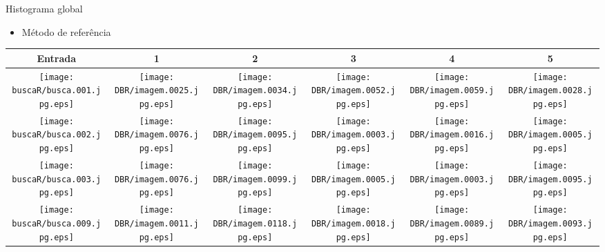 \documentclass[
    style=paintings,
    paper=screen,
    blackslide,
    nopagebreaks,
    fleqn
]{powerdot}
\begin{document}
\begin{slide}{Histograma global}
\begin{itemize}[type=1]
\item <1-> Método de referência
\end{itemize}
\vspace{-0.8cm}
\begin{table}[H]
\begin{center}
\begin{tabular}{c|ccccc}
\hline 
Entrada & 1 & 2 & 3 & 4 & 5\tabularnewline
\hline
\texttt{[image: buscaR/busca.001.jpg.eps]} & 
\texttt{[image: DBR/imagem.0025.jpg.eps]} & 
\texttt{[image: DBR/imagem.0034.jpg.eps]} & 
\texttt{[image: DBR/imagem.0052.jpg.eps]} & 
\texttt{[image: DBR/imagem.0059.jpg.eps]} &
\texttt{[image: DBR/imagem.0028.jpg.eps]} 
\tabularnewline
\hline 
\texttt{[image: buscaR/busca.002.jpg.eps]} & 
\texttt{[image: DBR/imagem.0076.jpg.eps]} & 
\texttt{[image: DBR/imagem.0095.jpg.eps]} & 
\texttt{[image: DBR/imagem.0003.jpg.eps]} & 
\texttt{[image: DBR/imagem.0016.jpg.eps]} &
\texttt{[image: DBR/imagem.0005.jpg.eps]} 
\tabularnewline
\hline 
\texttt{[image: buscaR/busca.003.jpg.eps]} & 
\texttt{[image: DBR/imagem.0076.jpg.eps]} & 
\texttt{[image: DBR/imagem.0099.jpg.eps]} & 
\texttt{[image: DBR/imagem.0005.jpg.eps]} & 
\texttt{[image: DBR/imagem.0003.jpg.eps]} &
\texttt{[image: DBR/imagem.0095.jpg.eps]} 
\tabularnewline
\hline 
\texttt{[image: buscaR/busca.009.jpg.eps]} & 
\texttt{[image: DBR/imagem.0011.jpg.eps]} & 
\texttt{[image: DBR/imagem.0118.jpg.eps]} & 
\texttt{[image: DBR/imagem.0018.jpg.eps]} & 
\texttt{[image: DBR/imagem.0089.jpg.eps]} &
\texttt{[image: DBR/imagem.0093.jpg.eps]} 
\tabularnewline
\hline 
\end{tabular}
\end{center}
\end{table}
\end{slide}
\end{document}
